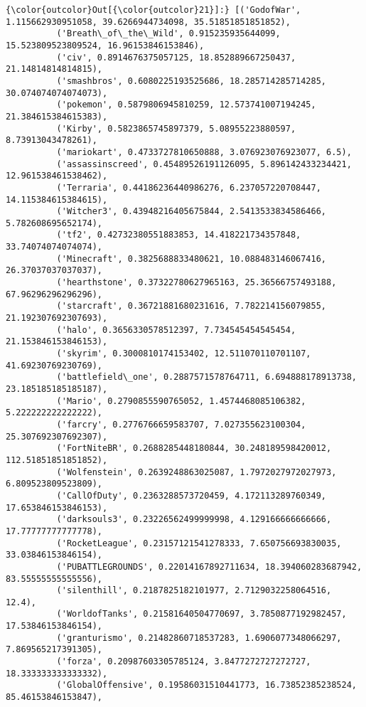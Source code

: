 \documentclass[11pt]{article}
\begin{document}
\begin{Verbatim}[commandchars=\\\{\}]
{\color{outcolor}Out[{\color{outcolor}21}]:} [('GodofWar', 1.115662930951058, 39.6266944734098, 35.51851851851852),
          ('Breath\_of\_the\_Wild', 0.915235935644099, 15.523809523809524, 16.96153846153846),
          ('civ', 0.8914676375057125, 18.852889667250437, 21.14814814814815),
          ('smashbros', 0.6080225193525686, 18.285714285714285, 30.074074074074073),
          ('pokemon', 0.5879806945810259, 12.573741007194245, 21.384615384615383),
          ('Kirby', 0.5823865745897379, 5.08955223880597, 8.73913043478261),
          ('mariokart', 0.4733727810650888, 3.076923076923077, 6.5),
          ('assassinscreed', 0.45489526191126095, 5.896142433234421, 12.961538461538462),
          ('Terraria', 0.44186236440986276, 6.237057220708447, 14.115384615384615),
          ('Witcher3', 0.43948216405675844, 2.5413533834586466, 5.782608695652174),
          ('tf2', 0.42732380551883853, 14.418221734357848, 33.74074074074074),
          ('Minecraft', 0.3825688833480621, 10.088483146067416, 26.37037037037037),
          ('hearthstone', 0.37322780627965163, 25.36566757493188, 67.96296296296296),
          ('starcraft', 0.36721881680231616, 7.782214156079855, 21.192307692307693),
          ('halo', 0.3656330578512397, 7.734545454545454, 21.153846153846153),
          ('skyrim', 0.3000810174153402, 12.511070110701107, 41.69230769230769),
          ('battlefield\_one', 0.2887571578764711, 6.694888178913738, 23.185185185185187),
          ('Mario', 0.2790855590765052, 1.4574468085106382, 5.222222222222222),
          ('farcry', 0.2776766659583707, 7.027355623100304, 25.307692307692307),
          ('FortNiteBR', 0.2688285448180844, 30.248189598420012, 112.51851851851852),
          ('Wolfenstein', 0.2639248863025087, 1.7972027972027973, 6.809523809523809),
          ('CallOfDuty', 0.2363288573720459, 4.172113289760349, 17.653846153846153),
          ('darksouls3', 0.23226562499999998, 4.129166666666666, 17.77777777777778),
          ('RocketLeague', 0.23157121541278333, 7.650756693830035, 33.03846153846154),
          ('PUBATTLEGROUNDS', 0.22014167892711634, 18.394060283687942, 83.55555555555556),
          ('silenthill', 0.2187825182101977, 2.7129032258064516, 12.4),
          ('WorldofTanks', 0.21581640504770697, 3.7850877192982457, 17.53846153846154),
          ('granturismo', 0.21482860718537283, 1.6906077348066297, 7.869565217391305),
          ('forza', 0.20987603305785124, 3.8477272727272727, 18.333333333333332),
          ('GlobalOffensive', 0.19586031510441773, 16.73852385238524, 85.46153846153847),

\end{Verbatim}
\end{document}
